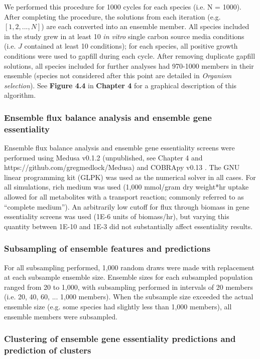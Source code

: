 \documentclass[11pt,twocolumn,notitlepage,openany,twoside]{book}
\begin{document}
\begin{refsection}
We performed this procedure for 1000 cycles for each species (i.e. N = 1000). After completing the procedure, the solutions from each iteration (e.g. $[1,2,...,N]$) are each converted into an ensemble member. All species included in the study grew in at least 10 \textit{in vitro} single carbon source media conditions (i.e. $J$ contained at least 10 conditions); for each species, all positive growth conditions were used to gapfill during each cycle. After removing duplicate gapfill solutions, all species included for further analyses had 970-1000 members in their ensemble (species not considered after this point are detailed in \textit{Organism selection}). See \textbf{Figure 4.4} in \textbf{Chapter 4} for a graphical description of this algorithm.

\subsubsection{Ensemble flux balance analysis and ensemble gene essentiality}

Ensemble flux balance analysis and ensemble gene essentiality screens were performed using Medusa v0.1.2 (unpublished, see Chapter 4 and https://github.com/gregmedlock/Medusa) and COBRApy v0.13 \cite{Ebrahim2013-eb}. The GNU linear programming kit (GLPK) was used as the numerical solver in all cases. For all simulations, rich medium was used (1,000 mmol/gram dry weight*hr uptake allowed for all metabolites with a transport reaction; commonly referred to as “complete medium”). An arbitrarily low cutoff for flux through biomass in gene essentiality screens was used (1E-6 units of biomass/hr), but varying this quantity between 1E-10 and 1E-3 did not substantially affect essentiality results.

\subsubsection{Subsampling of ensemble features and predictions}

For all subsampling performed, 1,000 random draws were made with replacement at each subsample ensemble size. Ensemble sizes for each subsampled population ranged from 20 to 1,000, with subsampling performed in intervals of 20 members (i.e. 20, 40, 60, ... 1,000 members). When the subsample size exceeded the actual ensemble size (e.g. some species had slightly less than 1,000 members), all ensemble members were subsampled.

\subsubsection{Clustering of ensemble gene essentiality predictions and prediction of clusters}


\end{refsection}
\end{document}
